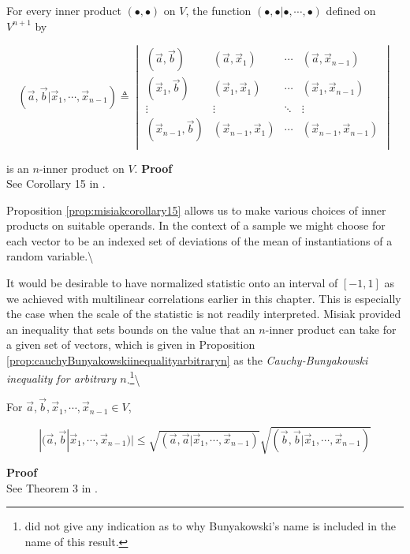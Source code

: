 \documentclass[
  letterpaper,
  DIV=11,
  numbers=noendperiod]{scrreprt}
\begin{document}
\begin{Proposition}[myproposition=\cite{Misiak1989}, label=prop:misiakcorollary15]

For every inner product $(\bullet, \bullet)$ on $V$, the function $( \bullet, \bullet | \bullet, \cdots, \bullet )$ defined on $V^{n+1}$ by

$$( \vec{a}, \vec{b} | \vec{x}_1, \cdots, \vec{x}_{n-1} ) \triangleq \begin{vmatrix}
(\vec{a}, \vec{b}) & (\vec{a}, \vec{x}_1) & \cdots & (\vec{a}, \vec{x}_{n-1}) \\ 
(\vec{x}_1, \vec{b}) & (\vec{x}_1, \vec{x}_1) & \cdots & (\vec{x}_1, \vec{x}_{n-1}) \\ 
\vdots & \vdots & \ddots & \vdots \\
(\vec{x}_{n-1}, \vec{b}) & (\vec{x}_{n-1}, \vec{x}_1) & \cdots & (\vec{x}_{n-1}, \vec{x}_{n-1}) \\
\end{vmatrix} $$

is an $n$-inner product on $V$.
\tcbline
\textbf{Proof}\\
See Corollary 15 in \cite{Misiak1989}.
\end{Proposition}

Proposition \ref{prop:misiakcorollary15} allows us to make various
choices of inner products on suitable operands. In the context of a
sample we might choose for each vector to be an indexed set of
deviations of the mean of instantiations of a random
variable.\textbackslash{}

It would be desirable to have normalized statistic onto an interval of
\([-1,1]\) as we achieved with multilinear correlations earlier in this
chapter. This is especially the case when the scale of the statistic is
not readily interpreted. Misiak provided an inequality that sets bounds
on the value that an \(n\)-inner product can take for a given set of
vectors, which is given in Proposition
\ref{prop:cauchyBunyakowskiinequalityarbitraryn} as the
\textit{Cauchy-Bunyakowski inequality for arbitrary $n$}.\footnote{\cite{Misiak1989} did not give any indication as to why Bunyakowski's name is included in the name of this result.}\textbackslash{}

\begin{Proposition}[myproposition=Cauchy-Bunyakowski Inequality for Arbitrary $n$ \cite{Misiak1989}, label=prop:cauchyBunyakowskiinequalityarbitraryn]
For $\vec{a}, \vec{b}, \vec{x}_1, \cdots, \vec{x}_{n-1} \in V$,

$$|(\vec{a}, \vec{b}| \vec{x}_1, \cdots, \vec{x}_{n-1})| \leq \sqrt{ \left(\vec{a}, \vec{a}| \vec{x}_1, \cdots, \vec{x}_{n-1} \right)} \sqrt{ \left(\vec{b}, \vec{b}| \vec{x}_1, \cdots, \vec{x}_{n-1} \right)} $$

\tcbline
\textbf{Proof}\\
See Theorem 3 in \cite{Misiak1989}.
\end{Proposition}
\end{document}
